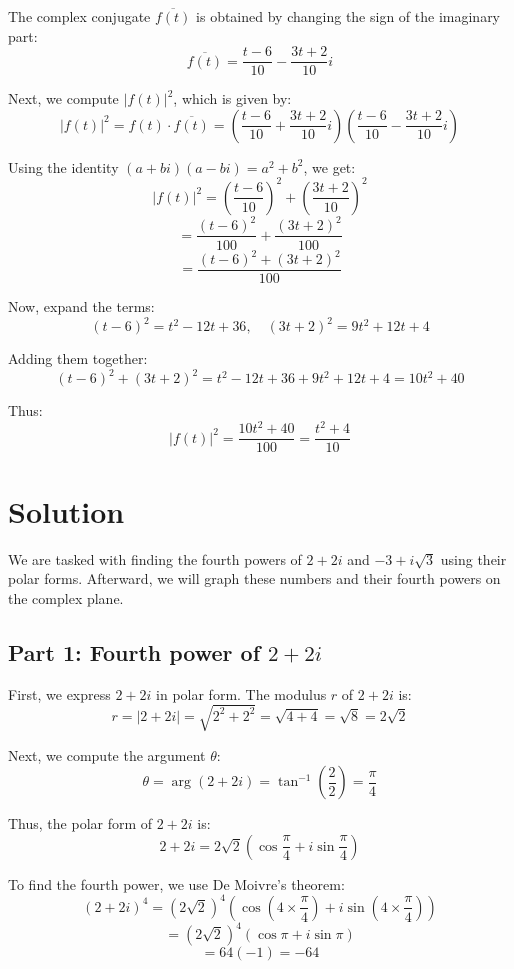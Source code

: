 \documentclass[11pt]{article}
\begin{document}
The complex conjugate \( \overline{f(t)} \) is obtained by changing the sign of the imaginary part:
\[
\overline{f(t)} = \frac{t - 6}{10} - \frac{3t + 2}{10}i
\]

Next, we compute \( |f(t)|^2 \), which is given by:
\[
|f(t)|^2 = f(t) \cdot \overline{f(t)} = \left( \frac{t - 6}{10} + \frac{3t + 2}{10}i \right) \left( \frac{t - 6}{10} - \frac{3t + 2}{10}i \right)
\]

Using the identity \( (a + bi)(a - bi) = a^2 + b^2 \), we get:
\[
|f(t)|^2 = \left( \frac{t - 6}{10} \right)^2 + \left( \frac{3t + 2}{10} \right)^2
\]
\[
= \frac{(t - 6)^2}{100} + \frac{(3t + 2)^2}{100}
\]
\[
= \frac{(t - 6)^2 + (3t + 2)^2}{100}
\]

Now, expand the terms:
\[
(t - 6)^2 = t^2 - 12t + 36, \quad (3t + 2)^2 = 9t^2 + 12t + 4
\]

Adding them together:
\[
(t - 6)^2 + (3t + 2)^2 = t^2 - 12t + 36 + 9t^2 + 12t + 4 = 10t^2 + 40
\]

Thus:
\[
|f(t)|^2 = \frac{10t^2 + 40}{100} = \frac{t^2 + 4}{10}
\]




\newpage

\section{Solution}

We are tasked with finding the fourth powers of \( 2 + 2i \) and \( -3 + i\sqrt{3} \) using their polar forms. Afterward, we will graph these numbers and their fourth powers on the complex plane.

\subsection{Part 1: Fourth power of \( 2 + 2i \)}

First, we express \( 2 + 2i \) in polar form. The modulus \( r \) of \( 2 + 2i \) is:
\[
r = |2 + 2i| = \sqrt{2^2 + 2^2} = \sqrt{4 + 4} = \sqrt{8} = 2\sqrt{2}
\]

Next, we compute the argument \( \theta \):
\[
\theta = \arg(2 + 2i) = \tan^{-1}\left( \frac{2}{2} \right) = \frac{\pi}{4}
\]

Thus, the polar form of \( 2 + 2i \) is:
\[
2 + 2i = 2\sqrt{2} \left( \cos\frac{\pi}{4} + i \sin\frac{\pi}{4} \right)
\]

To find the fourth power, we use De Moivre's theorem:
\[
(2 + 2i)^4 = \left( 2\sqrt{2} \right)^4 \left( \cos\left( 4 \times \frac{\pi}{4} \right) + i \sin\left( 4 \times \frac{\pi}{4} \right) \right)
\]
\[
= (2\sqrt{2})^4 \left( \cos\pi + i \sin\pi \right)
\]
\[
= 64(-1) = -64
\]
\end{document}
